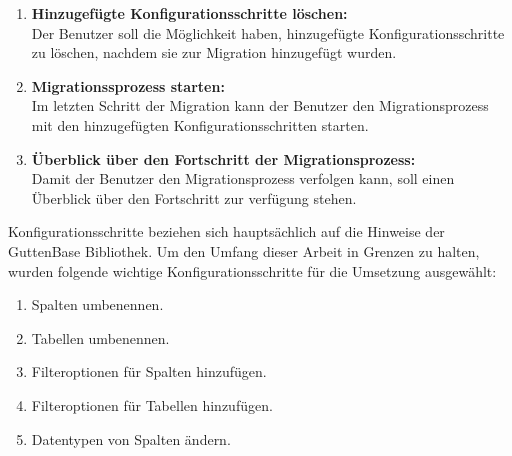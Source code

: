 \begin{enumerate}
	\item \textbf{Hinzugefügte Konfigurationsschritte löschen:}\\	
	Der Benutzer soll die Möglichkeit haben, hinzugefügte Konfigurationsschritte zu löschen, nachdem sie zur Migration hinzugefügt wurden.
	\item \textbf{Migrationssprozess starten:} \\
	Im letzten Schritt der Migration kann der Benutzer den Migrationsprozess mit den hinzugefügten Konfigurationsschritten starten.	
	\item \textbf{Überblick über den Fortschritt der Migrationsprozess:}\\
	Damit der Benutzer den Migrationsprozess verfolgen kann, soll einen Überblick über den Fortschritt zur verfügung stehen. 
\end{enumerate}
Konfigurationsschritte beziehen sich hauptsächlich auf die Hinweise der GuttenBase Bibliothek. Um den Umfang dieser Arbeit in Grenzen zu halten, wurden folgende wichtige Konfigurationsschritte für die Umsetzung ausgewählt:

\begin{enumerate}
	\item Spalten  umbenennen.
	\item Tabellen umbenennen.
	\item Filteroptionen für Spalten hinzufügen.
	\item Filteroptionen für Tabellen hinzufügen.
	\item Datentypen von Spalten ändern.
\end{enumerate}





